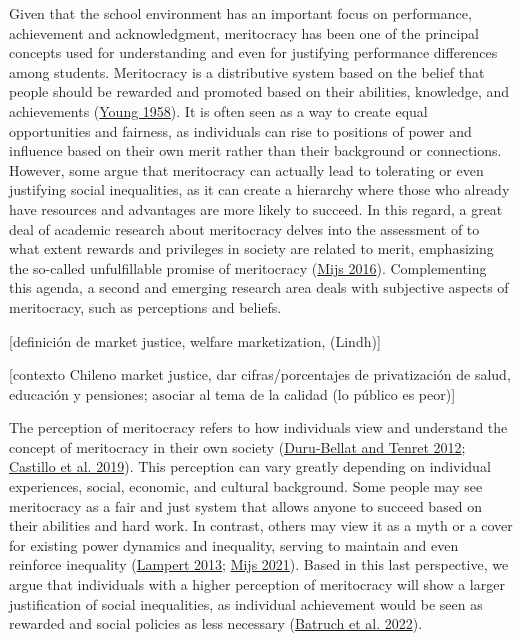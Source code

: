 \documentclass[
  letterpaper,
  DIV=11,
  numbers=noendperiod]{scrartcl}
\begin{document}
Given that the school environment has an important focus on performance,
achievement and acknowledgment, meritocracy has been one of the
principal concepts used for understanding and even for justifying
performance differences among students. Meritocracy is a distributive
system based on the belief that people should be rewarded and promoted
based on their abilities, knowledge, and achievements
(\protect\hyperlink{ref-young_rise_1958}{Young 1958}). It is often seen
as a way to create equal opportunities and fairness, as individuals can
rise to positions of power and influence based on their own merit rather
than their background or connections. However, some argue that
meritocracy can actually lead to tolerating or even justifying social
inequalities, as it can create a hierarchy where those who already have
resources and advantages are more likely to succeed. In this regard, a
great deal of academic research about meritocracy delves into the
assessment of to what extent rewards and privileges in society are
related to merit, emphasizing the so-called unfulfillable promise of
meritocracy (\protect\hyperlink{ref-mijs_stratified_2016}{Mijs 2016}).
Complementing this agenda, a second and emerging research area deals
with subjective aspects of meritocracy, such as perceptions and
beliefs.~

{[}definición de market justice, welfare marketization, (Lindh){]}

{[}contexto Chileno market justice, dar cifras/porcentajes de
privatización de salud, educación y pensiones; asociar al tema de la
calidad (lo público es peor){]}

The perception of meritocracy refers to how individuals view and
understand the concept of meritocracy in their own society
(\protect\hyperlink{ref-duru-bellat_who_2012}{Duru-Bellat and Tenret
2012}; \protect\hyperlink{ref-castillo_meritocracia_2019}{Castillo et
al. 2019}). This perception can vary greatly depending on individual
experiences, social, economic, and cultural background. Some people may
see meritocracy as a fair and just system that allows anyone to succeed
based on their abilities and hard work. In contrast, others may view it
as a myth or a cover for existing power dynamics and inequality, serving
to maintain and even reinforce inequality
(\protect\hyperlink{ref-lampert_meritocratic_2013}{Lampert 2013};
\protect\hyperlink{ref-mijs_paradox_2021}{Mijs 2021}). Based in this
last perspective, we argue that individuals with a higher perception of
meritocracy will show a larger justification of social inequalities, as
individual achievement would be seen as rewarded and social policies as
less necessary (\protect\hyperlink{ref-batruch_belief_2022}{Batruch et
al. 2022}).
\end{document}
